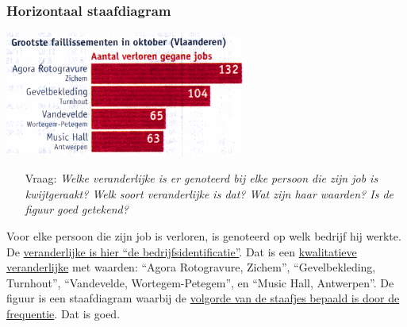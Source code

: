 \documentclass[dutch]{beamer}
\newcommand{\vraag}[1]{\begin{itemize}\item[Vraag:] {\it #1}\end{itemize}}
\begin{document}
\begin{frame}
\frametitle{Horizontaal staafdiagram}
\begin{center}
  \includegraphics[width=0.6\textwidth]{horizontaal_staafdiagram-faillissementen}
\end{center}
\vraag{Welke veranderlijke is er genoteerd bij elke persoon die zijn job is
kwijtgeraakt? Welk soort veranderlijke is dat? Wat zijn haar waarden? Is de figuur goed
getekend?}
\pause
Voor elke persoon die zijn job is verloren, is genoteerd op welk bedrijf hij werkte. De
\uline{veranderlijke is hier “de bedrijfsidentificatie”}. Dat is een \uline{kwalitatieve
veranderlijke} met waarden: “Agora Rotogravure, Zichem”, “Gevelbekleding, Turnhout”,
“Vandevelde, Wortegem-Petegem”, en “Music Hall, Antwerpen”. De figuur is een
staafdiagram waarbij de \uline{volgorde van de staafjes bepaald is door de frequentie}. Dat is goed.
\end{frame}
\end{document}
